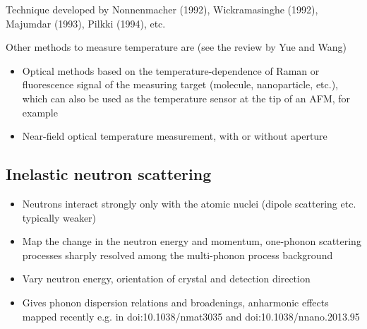 Technique developed by Nonnenmacher (1992), Wickramasinghe (1992), Majumdar (1993), Pilkki (1994), etc.

Other methods to measure temperature are (see the review by Yue and Wang)
\begin{itemize}
 \item Optical methods based on the temperature-dependence of Raman or fluorescence signal of the measuring target (molecule, nanoparticle, etc.), which can also be used as the temperature sensor at the tip of an AFM, for example
 \item Near-field optical temperature measurement, with or without aperture
\end{itemize}

\subsection{Inelastic neutron scattering}
 \begin{itemize}
  \item Neutrons interact strongly only with the atomic nuclei (dipole scattering etc. typically weaker)
  \item Map the change in the neutron energy and momentum, one-phonon scattering processes sharply resolved among the multi-phonon process background
  \item Vary neutron energy, orientation of crystal and detection direction
  \item Gives phonon dispersion relations and broadenings, anharmonic effects mapped recently e.g. in doi:10.1038/nmat3035 and doi:10.1038/nnano.2013.95
 \end{itemize}
\fi
